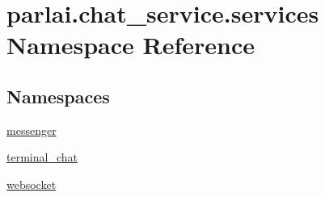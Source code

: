 \hypertarget{namespaceparlai_1_1chat__service_1_1services}{}\section{parlai.\+chat\+\_\+service.\+services Namespace Reference}
\label{namespaceparlai_1_1chat__service_1_1services}
\subsection*{Namespaces}
\begin{DoxyCompactItemize}
\item 
 \hyperlink{namespaceparlai_1_1chat__service_1_1services_1_1messenger}{messenger}
\item 
 \hyperlink{namespaceparlai_1_1chat__service_1_1services_1_1terminal__chat}{terminal\+\_\+chat}
\item 
 \hyperlink{namespaceparlai_1_1chat__service_1_1services_1_1websocket}{websocket}
\end{DoxyCompactItemize}

